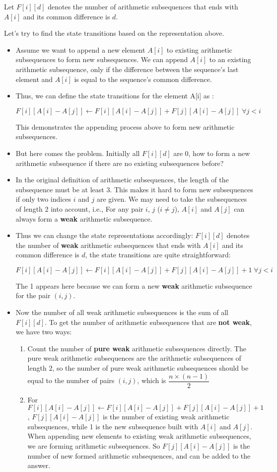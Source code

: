 Let $F[i][d]$ denotes the number of arithmetic subsequences that ends with $A[i]$ and its common difference is $d$.

Let's try to find the state transitions based on the representation above. 

\begin{itemize}
\item Assume we want to append a new element $A[i]$ to existing arithmetic subsequences to form new subsequences. We can append $A[i]$ to an existing arithmetic subsequence, only if the difference between the sequence's last element and $A[i]$ is equal to the sequence's common difference.
\item Thus, we can define the state transitions for the element A[i] as :

\[F[i][A[i] - A[j]] \gets F[i][A[i]-A[j]] +  F[j][A[i] - A[j]] \; \forall j < i\]

This demonstrates the appending process above to form new arithmetic subsequences.
\item But here comes the problem. Initially all $F[i][d]$ are 0, how to form a new arithmetic subsequence if there are no existing subsequences before?
\item In the original definition of arithmetic subsequences, the length of the subsequence must be at least 3. This makes it hard to form new subsequences if only two indices $i$ and $j$ are given. We may need to take the subsequences of length 2 into account, i.e., For any pair $i$, $j$ ($i \neq j$), $A[i]$ and $A[j]$ can always form a \textbf{weak} arithmetic subsequence.
\item Thus we can change the state representations accordingly: $F[i][d]$ denotes the number of \textbf{weak} arithmetic subsequences that ends with $A[i]$ and its common difference is $d$, the state transitions are quite straightforward:

\[F[i][A[i] - A[j]] \gets F[i][A[i]-A[j]] +  F[j][A[i] - A[j]] + 1\; \forall j < i\]

The 1 appears here because we can form a new \textbf{weak} arithmetic subsequence for the pair $(i, j)$.
\item Now the number of all weak arithmetic subsequences is the sum of all $F[i][d]$. To get the number of arithmetic subsequences that are \textbf{not weak}, we have two ways:
\begin{enumerate}
\item Count the number of \textbf{pure weak} arithmetic subsequences directly. The pure weak arithmetic subsequences are the arithmetic subsequences of length 2, so the number of pure weak arithmetic subsequences should be equal to the number of pairs $(i, j)$, which is $\dfrac{n \times (n - 1)}{2}$
\item For $F[i][A[i] - A[j]] \gets F[i][A[i]-A[j]] +  F[j][A[i] - A[j]] + 1$, $F[j][A[i] - A[j]]$ is the number of existing weak arithmetic subsequences, while 1 is the new subsequence built with $A[i]$ and $A[j]$. When appending new elements to existing weak arithmetic subsequences, we are forming arithmetic subsequences. So $F[j][A[i] - A[j]]$ is the number of new formed arithmetic subsequences, and can be added to the answer.
\end{enumerate}
\end{itemize}
